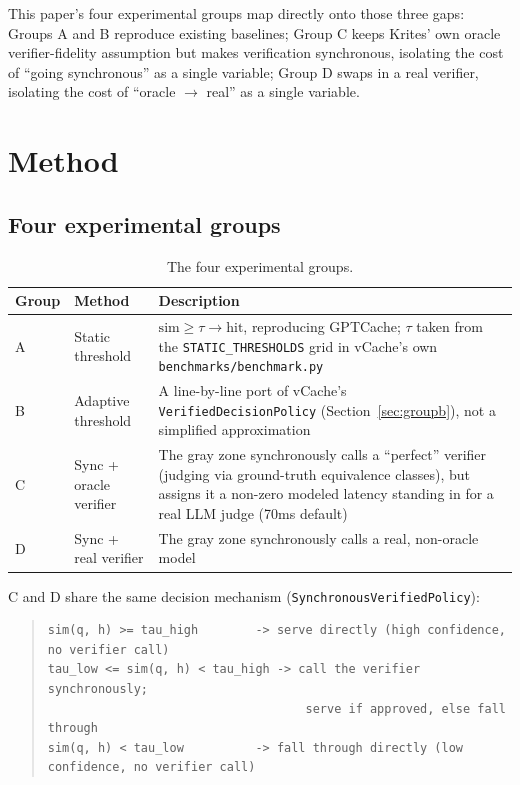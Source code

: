 \documentclass[11pt]{article}
\newenvironment{fittab}{\begin{lrbox}{\fittabbox}}{\end{lrbox}%
  \ifdim\wd\fittabbox>\linewidth\resizebox{\linewidth}{!}{\usebox{\fittabbox}}\else\usebox{\fittabbox}\fi}
\begin{document}
This paper's four experimental groups map directly onto those three gaps: Groups A and B reproduce existing baselines; Group C keeps Krites' own oracle verifier-fidelity assumption but makes verification synchronous, isolating the cost of ``going synchronous'' as a single variable; Group D swaps in a real verifier, isolating the cost of ``oracle $\rightarrow$ real'' as a single variable.

\section{Method}

\subsection{Four experimental groups}

\begin{table}[h]
\centering
\small
\begin{fittab}\begin{tabular}{@{}lp{2.6cm}p{9cm}@{}}
\toprule
\textbf{Group} & \textbf{Method} & \textbf{Description} \\
\midrule
A & Static threshold & $\text{sim} \geq \tau \rightarrow \text{hit}$, reproducing GPTCache; $\tau$ taken from the \texttt{STATIC\_\allowbreak{}THRESHOLDS} grid in vCache's own \texttt{benchmarks/\allowbreak{}benchmark.\allowbreak{}py} \\
\addlinespace
B & Adaptive threshold & A line-by-line port of vCache's \texttt{Verified\allowbreak{}Decision\allowbreak{}Policy} (Section~\ref{sec:groupb}), not a simplified approximation \\
\addlinespace
C & Sync + oracle verifier & The gray zone synchronously calls a ``perfect'' verifier (judging via ground-truth equivalence classes), but assigns it a non-zero modeled latency standing in for a real LLM judge (70ms default) \\
\addlinespace
D & Sync + real verifier & The gray zone synchronously calls a real, non-oracle model \\
\bottomrule
\end{tabular}\end{fittab}
\caption{The four experimental groups.}
\end{table}

C and D share the same decision mechanism (\texttt{Synchronous\allowbreak{}Verified\allowbreak{}Policy}):

\begin{quote}\footnotesize
\begin{verbatim}
sim(q, h) >= tau_high        -> serve directly (high confidence, no verifier call)
tau_low <= sim(q, h) < tau_high -> call the verifier synchronously;
                                    serve if approved, else fall through
sim(q, h) < tau_low          -> fall through directly (low confidence, no verifier call)
\end{verbatim}
\end{quote}
\end{document}
